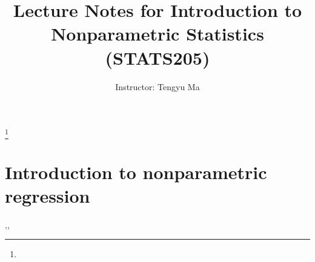 \documentclass{book}
\theoremstyle{definition}
\theoremstyle{remark}
\numberwithin{section}{chapter}
\numberwithin{equation}{chapter}
\begin{document}
\frontmatter

\title{Lecture Notes for Introduction to Nonparametric Statistics (STATS205)}


\author{Instructor: Tengyu Ma}
\thanks{}






\maketitle


\setcounter{page}{4}

\tableofcontents

%
\mainmatter
\let\sec\section
\let\subsec\subsection

\chapter{Introduction to nonparametric regression}



%
,,
\appendix


\backmatter


\end{document}
